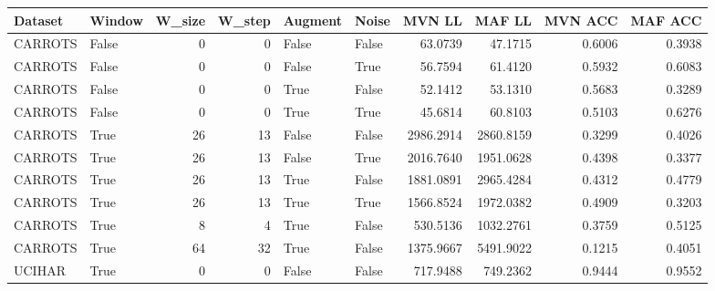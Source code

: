 \begin{tabular}{llrrllrrrr}
\toprule
Dataset &  Window &  W\_size &  W\_step &  Augment &  Noise &    MVN LL &    MAF LL &  MVN ACC &  MAF ACC \\
\midrule
CARROTS &   False &       0 &       0 &    False &  False &   63.0739 &   47.1715 &   0.6006 &   0.3938 \\
CARROTS &   False &       0 &       0 &    False &   True &   56.7594 &   61.4120 &   0.5932 &   0.6083 \\
CARROTS &   False &       0 &       0 &     True &  False &   52.1412 &   53.1310 &   0.5683 &   0.3289 \\
CARROTS &   False &       0 &       0 &     True &   True &   45.6814 &   60.8103 &   0.5103 &   0.6276 \\
CARROTS &    True &      26 &      13 &    False &  False & 2986.2914 & 2860.8159 &   0.3299 &   0.4026 \\
CARROTS &    True &      26 &      13 &    False &   True & 2016.7640 & 1951.0628 &   0.4398 &   0.3377 \\
CARROTS &    True &      26 &      13 &     True &  False & 1881.0891 & 2965.4284 &   0.4312 &   0.4779 \\
CARROTS &    True &      26 &      13 &     True &   True & 1566.8524 & 1972.0382 &   0.4909 &   0.3203 \\
CARROTS &    True &       8 &       4 &     True &  False &  530.5136 & 1032.2761 &   0.3759 &   0.5125 \\
CARROTS &    True &      64 &      32 &     True &  False & 1375.9667 & 5491.9022 &   0.1215 &   0.4051 \\
 UCIHAR &    True &       0 &       0 &    False &  False &  717.9488 &  749.2362 &   0.9444 &   0.9552 \\
\bottomrule
\end{tabular}
